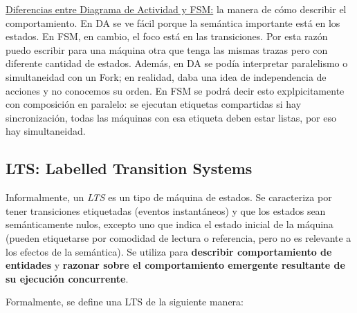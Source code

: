 \documentclass[]{article}
\begin{document}
\underline{Diferencias entre Diagrama de Actividad y FSM:} la manera de cómo describir el comportamiento. En DA se ve fácil porque la semántica importante está en los estados. En FSM, en cambio, el foco está en las transiciones. Por esta razón puedo escribir para una máquina otra que tenga las mismas trazas pero con diferente cantidad de estados. Además, en DA se podía interpretar paralelismo o simultaneidad con un Fork; en realidad, daba una idea de independencia de acciones y no conocemos su orden. En FSM se podrá decir esto explpicitamente con composición en paralelo: se ejecutan etiquetas compartidas si hay sincronización, todas las máquinas con esa etiqueta deben estar listas, por eso hay simultaneidad.

\subsection{LTS: Labelled Transition Systems}
Informalmente, un \textit{LTS} es un tipo de máquina de estados. Se caracteriza por tener transiciones etiquetadas (eventos instantáneos) y que los estados sean semánticamente nulos, excepto uno que indica el estado inicial de la máquina (pueden etiquetarse por comodidad de lectura o referencia, pero no es relevante a los efectos de la semántica). Se utiliza para \textbf{describir comportamiento de entidades} y \textbf{razonar sobre el comportamiento emergente resultante de su ejecución concurrente}.

Formalmente, se define una LTS de la siguiente manera:

\end{document}
